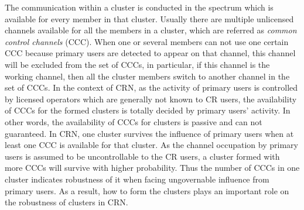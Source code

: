 \documentclass[10pt,journal,compsoc]{IEEEtran}
\theoremstyle{mytheoremstyle}
\theoremstyle{mytheoremstyle}
\theoremstyle{mytheoremstyle}
\newcommand{\ie}{i.e., }
\begin{document}

The communication within a cluster is conducted in the spectrum which is available for every member in that cluster.
Usually there are multiple unlicensed channels available for all the members in a cluster, which are referred as \textit{common control channels} (CCC).
When one or several members can not use one certain CCC because primary users are detected to appear on that channel, this channel will be excluded from the set of CCCs, in particular, if this channel is the working channel, then all the cluster members switch to another channel in the set of CCCs.
In the context of CRN, as the activity of primary users is controlled by licensed operators which are generally not known to CR users, the availability of CCCs for the formed clusters  is totally decided by primary users' activity.
In other words, the availability of CCCs for clusters is passive and can not guaranteed.
%
In CRN, one cluster survives the influence of primary users when at least one CCC is available for that cluster.
As the channel occupation by primary users is assumed to be uncontrollable to the CR users, a cluster formed with more CCCs will survive with higher probability.
Thus the number of CCCs in one cluster indicates robustness of it when facing ungovernable influence from primary users.
As a result, how to form the clusters plays an important role on the robustness of clusters in CRN.

\end{document}
